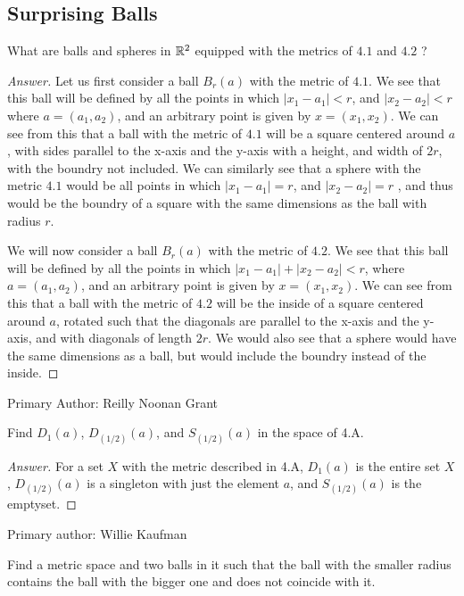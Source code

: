 \subsection{Surprising Balls}

\begin{minorEx}%
  What are balls and spheres in $\mathbb{R}^2$ equipped with the metrics
  of $4.1$ and $4.2$ ?
\end{minorEx}

\begin{proof}[Answer]
Let us first consider a ball $B_r(a)$ with the metric of $4.1$. We see that this
ball will be defined by all the points in which $|x_1-a_1|<r$,
and  $|x_2-a_2|<r$ where $a=(a_1,a_2)$, and an arbitrary point is given
by $x= (x_1,x_2)$. We can see from this that a ball with the metric of
$4.1$ will be a square centered around $a$, with sides parallel to
the x-axis and the y-axis with a height, and width
of $2r$, with the boundry not included. We can similarly see that a
sphere with the metric $4.1$ would be all points in which $|x_1-a_1|=r$,
and  $|x_2-a_2|=r$ , and thus would be the boundry of a square with
the same dimensions as the ball with radius $r$.

We will now consider a ball $B_r(a)$ with the metric of $4.2$. We see
that this ball will be defined by all the points in which 
$|x_1-a_1| + |x_2-a_2|<r$, where $a=(a_1,a_2)$, and
an arbitrary point is given by $x= (x_1,x_2)$. We can see from this
that a ball with the metric of $4.2$ will be the inside of a square centered around
$a$, rotated such that the diagonals are parallel to the x-axis and
the y-axis, and with diagonals of length $2r$. We would also see that
a sphere would have the same dimensions as a ball, but would include
the boundry instead of the inside.
\end{proof}

Primary Author: Reilly Noonan Grant

\begin{minorEx}%
Find $D_1(a)$, $D_(1/2)(a)$, and $S_(1/2)(a)$ in the space of 4.A.
\end{minorEx}
\begin{proof}[Answer]
For a set $X$ with the metric described in 4.A, $D_1(a)$ is the entire set $X$, $D_(1/2)(a)$ is a singleton with just the element $a$, and $S_(1/2)(a)$ is the emptyset.
\end{proof}

Primary author: Willie Kaufman

\begin{minorEx}%
    Find a metric space and two balls in it such that the ball with the smaller
    radius contains the ball with the bigger one and does not coincide with it.
\end{minorEx}

